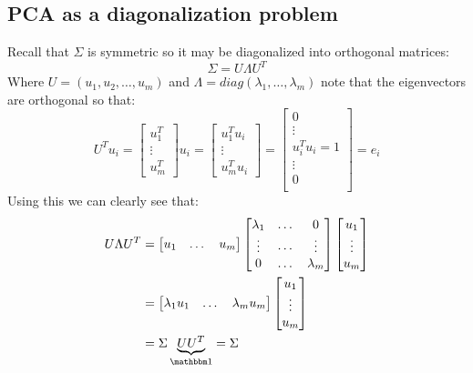		\subsection{PCA as a diagonalization problem}
		Recall that $\Sigma$ is symmetric so it may be diagonalized into orthogonal matrices:
		\begin{equation}
		\Sigma = U\Lambda U^T
		\end{equation}
		Where $U=(u_1, u_2, \dots, u_m)$ and $\Lambda = diag(\lambda_1, \dots, \lambda_m)$ note that the eigenvectors are orthogonal so that:
		\begin{equation}
			U^Tu_i = \begin{bmatrix}
			u_1^T\\
			\vdots\\
			u_m^T
			\end{bmatrix}u_i = \begin{bmatrix}
			u_1^Tu_i\\
			\vdots\\
			u_m^Tu_i
			\end{bmatrix} = \begin{bmatrix}
			0\\
			\vdots\\
			u_i^Tu_i = 1\\
			\vdots\\
			0\\
			\end{bmatrix}=e_i
		\end{equation}
		Using this we can clearly see that:
		\begin{equation}
		\begin{split}
			U\Lambda U^T & =\begin{bmatrix}
			u_1 & \dots & u_m\\
			\end{bmatrix}
			\begin{bmatrix}
			\lambda_1 &\dots & 0\\
			\vdots&\cdots&\vdots\\
			0& \dots& \lambda_m\\
			\end{bmatrix}
			\begin{bmatrix}
			u_1 \\ \vdots \\ u_m\\
			\end{bmatrix}		\\
			&=\begin{bmatrix}
			\lambda_1u_1 & \dots & \lambda_mu_m\\
			\end{bmatrix}\begin{bmatrix}
			u_1 \\ \vdots \\ u_m\\
			\end{bmatrix}\\
			&= \Sigma \underbrace{UU^T}_{\ID} = \Sigma
		\end{split}
		\end{equation}
